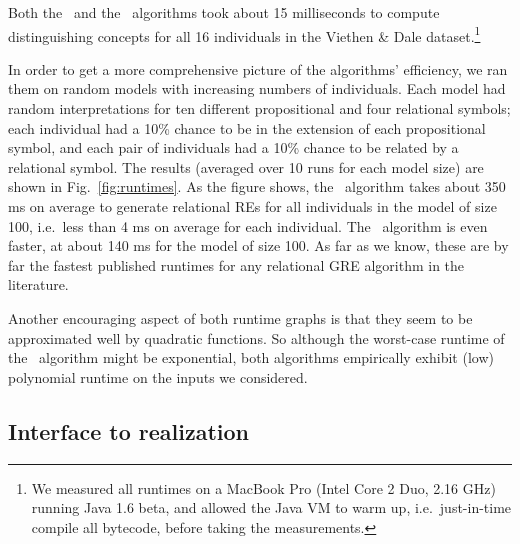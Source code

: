 Both the \el\ and the \alc\ algorithms took about 15 milliseconds to
compute distinguishing concepts for all 16 individuals in the Viethen
\& Dale dataset.\footnote{We measured all runtimes on a MacBook Pro
  (Intel Core 2 Duo, 2.16 GHz) running Java 1.6 beta, and allowed the
  Java VM to warm up, i.e.\ just-in-time compile all bytecode, before
  taking the measurements.}

In order to get a more comprehensive picture of the algorithms'
efficiency, we ran them on random models with increasing numbers of
individuals.  Each model had random interpretations for ten different
propositional and four relational symbols; each individual had a 10\%
chance to be in the extension of each propositional symbol, and each
pair of individuals had a 10\% chance to be related by a relational
symbol.  The results (averaged over 10 runs for each model size) are
shown in Fig.~\ref{fig:runtimes}.  As the figure shows, the \el\
algorithm takes about 350 ms on average to generate relational REs for
all individuals in the model of size 100, i.e.\ less than 4 ms on
average for each individual.  The \alc\ algorithm is even faster, at
about 140 ms for the model of size 100.  As far as we know, these are
by far the fastest published runtimes for any relational GRE algorithm
in the literature.

Another encouraging aspect of both runtime graphs is that they seem to
be approximated well by quadratic functions.  So although the
worst-case runtime of the \el\ algorithm might be exponential, both
algorithms empirically exhibit (low) polynomial runtime on the inputs
we considered.



\subsection{Interface to realization}
\label{sec:discussion-realization}


